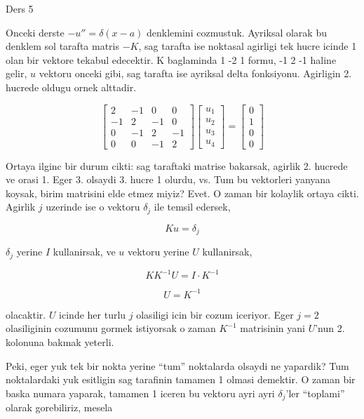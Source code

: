 \documentclass[12pt,fleqn]{article}\usepackage{../common}
\begin{document}
Ders 5

Onceki derste $-u'' = \delta(x-a)$ denklemini cozmustuk. Ayriksal olarak bu
denklem sol tarafta matris $-K$, sag tarafta ise noktasal agirligi tek
hucre icinde 1 olan bir vektore tekabul edecektir. K baglaminda 1 -2 1
formu, -1 2 -1 haline gelir, $u$ vektoru onceki gibi, sag tarafta ise
ayriksal delta fonksiyonu. Agirligin 2. hucrede oldugu ornek alttadir. 

\[  
\left[\begin{array}{cccc}
2 & -1 & 0 & 0 \\
-1 & 2 & -1 & 0 \\
0 & -1 & 2 & -1 \\
0 & 0 & -1 & 2 
\end{array}\right]
\left[\begin{array}{c}
u_1 \\
u_2 \\
u_3 \\
u_4
\end{array}\right]
=
\left[\begin{array}{c}
0 \\
1 \\
0 \\
0
\end{array}\right]
\]

Ortaya ilginc bir durum cikti: sag taraftaki matrise bakarsak, agirlik
2. hucrede ve orasi 1. Eger 3. olsaydi 3. hucre 1 olurdu, vs. Tum bu
vektorleri yanyana koysak, birim matrisini elde etmez miyiz? Evet. O zaman
bir kolaylik ortaya cikti. Agirlik $j$ uzerinde ise o vektoru $\delta_j$
ile temsil edersek, 

\[ Ku = \delta_j \]

$\delta_j$ yerine $I$ kullanirsak, ve $u$ vektoru yerine $U$ kullanirsak,

\[ KK^{-1}U = I \cdot K^{-1}\]

\[ U = K^{-1} \]

olacaktir. $U$ icinde her turlu $j$ olasiligi icin bir cozum iceriyor. Eger
$j=2$ olasiliginin cozumunu gormek istiyorsak o zaman $K^{-1}$ matrisinin
yani $U$'nun 2. kolonuna bakmak yeterli.

Peki, eger yuk tek bir nokta yerine ``tum'' noktalarda olsaydi ne yapardik?
Tum noktalardaki yuk esitligin sag tarafinin tamamen 1 olmasi demektir. O
zaman bir baska numara yaparak, tamamen 1 iceren bu vektoru ayri ayri
$\delta_j$'ler ``toplami'' olarak gorebiliriz, mesela
\end{document}
